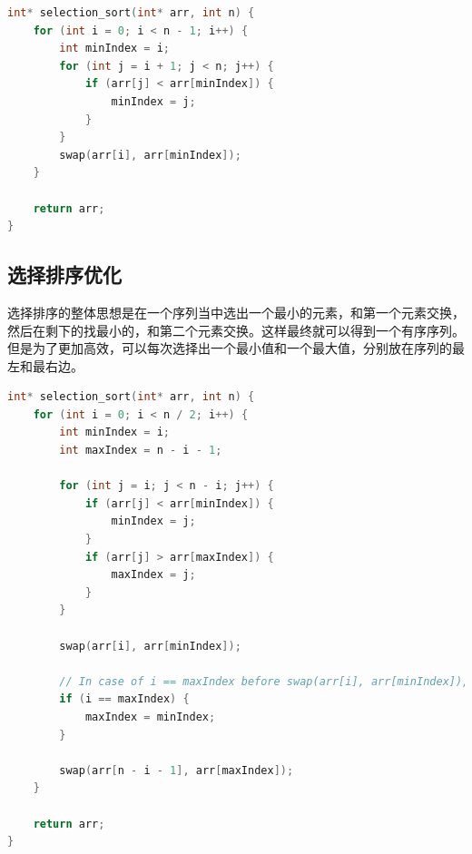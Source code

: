 \begin{table}[H]
	\centering
	\caption{选择排序算法分析}
\end{table}


\begin{lstlisting}[language=C++]
int* selection_sort(int* arr, int n) {
	for (int i = 0; i < n - 1; i++) {
		int minIndex = i;
		for (int j = i + 1; j < n; j++) {
			if (arr[j] < arr[minIndex]) {
				minIndex = j;
			}
		}
		swap(arr[i], arr[minIndex]);
	}

	return arr;
}
\end{lstlisting}

\vspace{0.5cm}

\subsection{选择排序优化}

选择排序的整体思想是在一个序列当中选出一个最小的元素，和第一个元素交换，然后在剩下的找最小的，和第二个元素交换。这样最终就可以得到一个有序序列。但是为了更加高效，可以每次选择出一个最小值和一个最大值，分别放在序列的最左和最右边。\\


\begin{lstlisting}[language=C++]
int* selection_sort(int* arr, int n) {
	for (int i = 0; i < n / 2; i++) {
		int minIndex = i;
		int maxIndex = n - i - 1;

		for (int j = i; j < n - i; j++) {
			if (arr[j] < arr[minIndex]) {
				minIndex = j;
			}
			if (arr[j] > arr[maxIndex]) {
				maxIndex = j;
			}
		}

		swap(arr[i], arr[minIndex]);

		// In case of i == maxIndex before swap(arr[i], arr[minIndex]), it's now at minIndex.
		if (i == maxIndex) {
			maxIndex = minIndex;
		}

		swap(arr[n - i - 1], arr[maxIndex]);
	}

	return arr;
}
\end{lstlisting}

